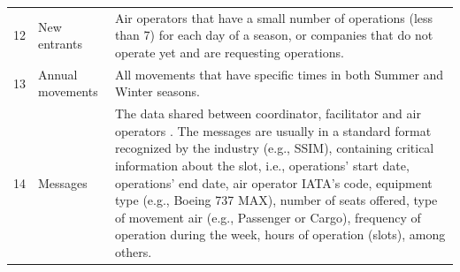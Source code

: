 \begin{center}
\begin{xltabular}{\textwidth}{p{0.5cm} p{4cm} p{10cm}}
12 & New entrants & Air operators that have a small number of operations (less than 7) for each day of a season, or companies that do not operate yet and are requesting operations. \\
13 & Annual movements & All movements that have specific times in both Summer and Winter seasons. \\
14 & Messages & The data shared between coordinator, facilitator and air operators \cite{SSIM2020}. The messages are usually in a standard format recognized by the industry (e.g., SSIM), containing critical information about the slot, i.e., operations' start date, operations' end date, air operator IATA's code, equipment type (e.g., Boeing 737 MAX), number of seats offered, type of movement air (e.g., Passenger or Cargo), frequency of operation during the week, hours of operation (slots), among others.\\ \hline
\end{xltabular}

\end{center}
